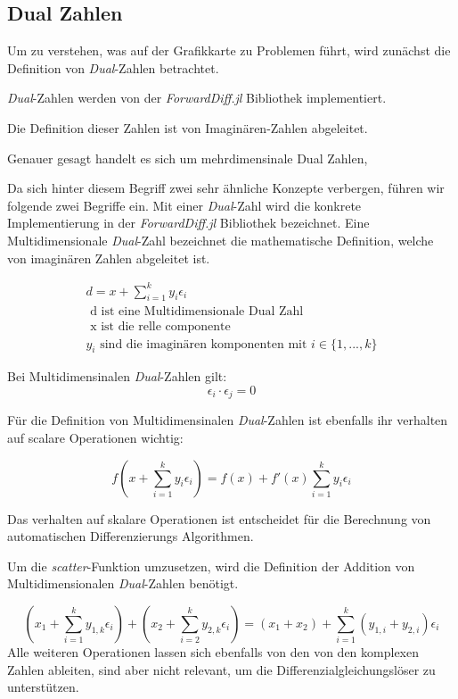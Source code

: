\subsection{Dual Zahlen} \label{sec:dual_zahlen}

Um zu verstehen, was auf der Grafikkarte zu Problemen führt, 
wird zunächst die Definition von \textit{Dual}-Zahlen betrachtet.

\textit{Dual}-Zahlen werden von der \textit{ForwardDiff.jl} Bibliothek \cite{juliaForwardDiffPackage}
implementiert. 

Die Definition dieser Zahlen ist von Imaginären-Zahlen abgeleitet.

Genauer gesagt handelt es sich um mehrdimensinale Dual Zahlen, 

Da sich hinter diesem Begriff zwei sehr ähnliche Konzepte verbergen, 
führen wir folgende zwei Begriffe ein.
Mit einer \textit{Dual}-Zahl wird die konkrete Implementierung in der \textit{ForwardDiff.jl} Bibliothek \cite{juliaForwardDiffPackage} bezeichnet.
Eine Multidimensionale \textit{Dual}-Zahl bezeichnet die mathematische Definition, 
welche von imaginären Zahlen abgeleitet ist.

\begin{gather}
 d = x + \sum_{i = 1}^{k} y_i \epsilon_i \\
	\text{ d ist eine Multidimensionale Dual Zahl } \\
	\text{ x ist die relle componente } \\
	y_i \text{ sind die imaginären komponenten mit } i \in \{1, ..., k\}
\end{gather}

Bei Multidimensinalen \textit{Dual}-Zahlen gilt:
\begin{equation}
 \epsilon_i \cdot \epsilon_j = 0
\end{equation}

Für die Definition von Multidimensinalen \textit{Dual}-Zahlen \cite{juliaForwardDiffPackage}
ist ebenfalls ihr verhalten auf scalare Operationen wichtig:

\begin{equation}
 f( x + \sum_{i = 1}^{k} y_i \epsilon_i  ) = f(x) +  f'(x) \sum_{i = 1}^{k} y_i \epsilon_i
\end{equation}

Das verhalten auf skalare Operationen ist entscheidet 
für die Berechnung von automatischen Differenzierungs Algorithmen.

Um die \textit{scatter}-Funktion umzusetzen, 
wird die Definition der Addition von Multidimensionalen \textit{Dual}-Zahlen \cite{RecentAdvances} benötigt.

\begin{equation}
(x_1 + \sum_{i = 1}^{k} y_{1,k} \epsilon_i) + ( x_2 + \sum_{i = 2}^{k} y_{2,k} \epsilon_i) = (x_1 + x_2) + \sum_{i = 1}^{k} (y_{1, i} + y_{2, i}) \epsilon_i
\end{equation}
Alle weiteren Operationen lassen sich ebenfalls von den von den komplexen Zahlen ableiten, 
sind aber nicht relevant, um die Differenzialgleichungslöser zu unterstützen.
